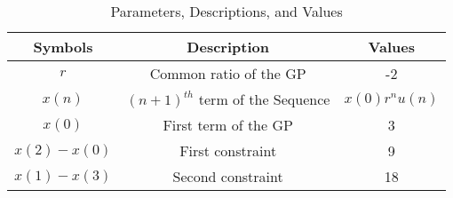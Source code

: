 \begin{table}[ht!]
\centering
\begin{tabular}{ |c|c|c| } 
 \hline
Symbols & Description & Values  \\
\hline
 $r$ & Common ratio of the GP & -2\\
 \hline
 $x(n)$ & $(n+1)^{th}$ term of the Sequence & $x(0)r^{n}u(n)$\\
 \hline
 $x(0)$ & First term of the GP & 3\\
\hline
 $x(2)-x(0)$ & First constraint & 9\\
 \hline
 $x(1)-x(3)$& Second constraint & 18\\
 \hline
\end{tabular}
\caption{Parameters, Descriptions, and Values}
\label{table:ee25-tab2}
\end{table}



